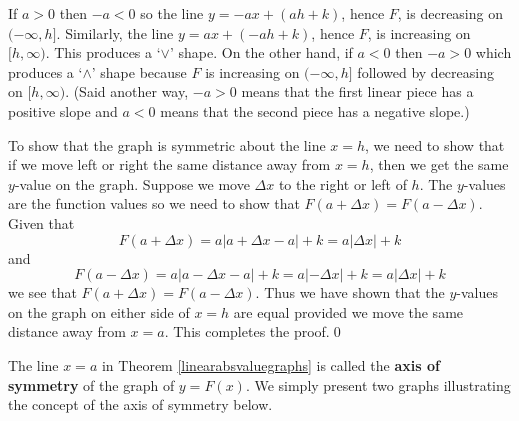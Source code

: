 \medskip

If $a > 0$ then $-a < 0$ so the line $y = -ax + (ah + k)$, hence $F$, is decreasing on $(-\infty, h]$.  Similarly,  the line $y = ax + (-ah + k)$, hence $F$, is increasing on $[h, \infty)$.  This produces a `$\vee$' shape.  On the other hand, if $a < 0$ then $-a > 0$ which produces a `$\wedge$' shape because $F$ is increasing on $(-\infty, h]$ followed by decreasing on $[h, \infty)$. (Said another way, $-a > 0$ means that the first linear piece has a positive slope and $a < 0$ means that the second piece has a negative slope.)

\medskip

To show that the graph is symmetric about the line $x = h$, we need to show that if we move left or right the same distance away from $x = h$, then we get the same $y$-value on the graph.  Suppose we move $\Delta x$ to the right or left of $h$.  The $y$-values are the function values so we need to show that $F(a + \Delta x) = F(a - \Delta x)$.   Given that \[F(a + \Delta x) = a| a + \Delta x - a| + k = a |\Delta x| + k\] and  \[F(a - \Delta x) = a | a - \Delta x - a| + k = a|-\Delta x| + k = a|\Delta x| + k\] we see that $F(a + \Delta x) = F(a - \Delta x)$. Thus we have shown that the $y$-values on the graph on either side of $x = h$ are equal provided we move the same distance away from $x = a$. This completes the proof.\qed

\medskip

The line $x = a$ in Theorem \ref{linearabsvaluegraphs} is called the  \textbf{axis of symmetry} of the graph of $y = F(x)$.  We simply present two graphs illustrating the concept of the axis of symmetry below.

